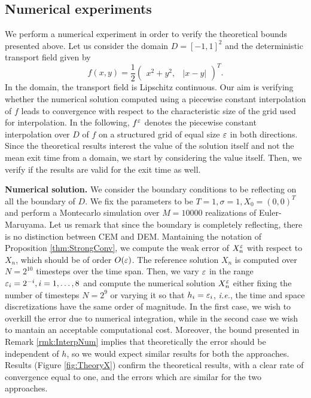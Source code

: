\subsection{Numerical experiments}

We perform a numerical experiment in order to verify the theoretical bounds presented above. Let us consider the domain $D = [-1, 1]^2$ and the deterministic transport field given by
\begin{equation*}
	f(x, y) = \frac{1}{2} \begin{pmatrix} x^2 + y^2, & |x - y| \end{pmatrix}^T.
\end{equation*}
In the domain, the transport field is Lipschitz continuous. Our aim is verifying whether the numerical solution computed using a piecewise constant interpolation of $f$ leads to convergence with respect to the characteristic size of the grid used for interpolation. In the following, $f^\varepsilon$ denotes the piecewise constant interpolation over $D$ of $f$ on a structured grid of equal size $\varepsilon$ in both directions. Since the theoretical results interest the value of the solution itself and not the mean exit time from a domain, we start by considering the value itself. Then, we verify if the results are valid for the exit time as well.

\vspace{2mm}
\noindent \textbf{Numerical solution.} We consider the boundary conditions to be reflecting on all the boundary of $D$. We fix the parameters to be $T = 1, \sigma = 1, X_0 = (0, 0)^T$ and perform a Montecarlo simulation over $M = 10000$ realizations of Euler-Maruyama. Let us remark that since the boundary is completely reflecting, there is no distinction between CEM and DEM. Mantaining the notation of Proposition \ref{thm:StrongConv}, we compute the weak error of $X_n^\varepsilon$ with respect to $X_n$, which should be of order $O(\varepsilon)$. The reference solution $X_n$ is computed over $N = 2^{10}$ timesteps over the time span. Then, we vary $\varepsilon$ in the range $\varepsilon_i = 2^{-i}, i = 1,\dots, 8$ and compute the numerical solution $X_n^\varepsilon$ either fixing the number of timesteps $N = 2^9$ or varying it so that $h_i = \varepsilon_i$, \textit{i.e.}, the time and space discretizations have the same order of magnitude. In the first case, we wish to overkill the error due to numerical integration, while in the second case we wish to mantain an acceptable computational cost. Moreover, the bound presented in Remark \ref{rmk:InterpNum} implies that theoretically the error should be independent of $h$, so we would expect similar results for both the approaches. Results (Figure \ref{fig:TheoryX}) confirm the theoretical results, with a clear rate of convergence equal to one, and the errors which are similar for the two approaches.

